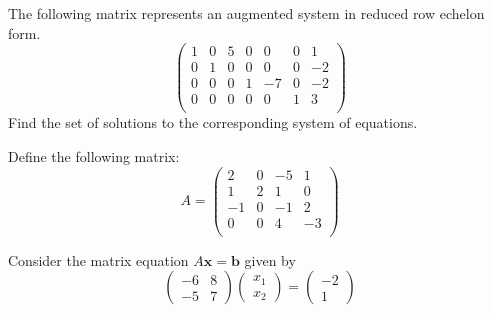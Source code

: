 \documentclass[12pt,letterpaper]{exam}
\begin{document}
\begin{questions}
\newpage
\question[10] The following matrix represents an augmented system in reduced row echelon form. 
	\[
	\begin{pmatrix}
	1 & 0 & 5 & 0 & 0 & 0 & 1 \\
	0 & 1 & 0 & 0 & 0 & 0 & -2 \\
	0 & 0 & 0 & 1 & -7 & 0 & -2 \\
	0 & 0 & 0 & 0 & 0 & 1 & 3 \\
	\end{pmatrix}
	\] 
Find the set of solutions to the corresponding system of equations. 





\newpage
\question Define the following matrix:
	\[
	A= \left(
	\begin{array}{rrrr}
	2 & 0 & -5 & 1 \\
	1 & 2 & 1 & 0 \\
	-1 & 0 & -1 & 2 \\
	0 & 0 & 4 & -3 \\
	\end{array} \right)
	\]






\newpage
\question Consider the matrix equation $A\mathbf{x}= \mathbf{b}$ given by
	\[
	\begin{pmatrix}
	-6 & 8 \\
	-5 & 7
	\end{pmatrix}
	\begin{pmatrix}
	x_1 \\
	x_2 
	\end{pmatrix}=
	\begin{pmatrix}
	-2 \\
	1
	\end{pmatrix}
	\] \pspace

\end{questions}
\end{document}
